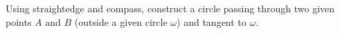 Using straightedge and compass, construct a circle passing through two given points $A$ and $B$ (outside a given circle $\omega$) and tangent to $\omega$.
